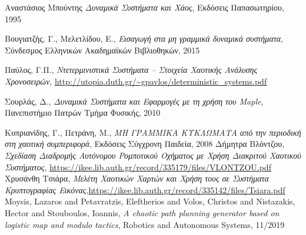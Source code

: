 \begin{thebibliography}{9}
	Αναστάσιος Μπούντης \emph{Δυναμικά Συστήματα και Χάος}, Εκδόσεις Παπασωτηρίου, 1995
	
	Βουγιατζής, Γ., Μελετλίδου, Ε.,\emph{ Εισαγωγή στα μη γραμμικά δυναμικά συστήματα}, Σύνδεσμος
	Ελληνικών Ακαδημαϊκών Βιβλιοθηκών, 2015
	
	Παύλος, Γ.Π., \emph{Ντετερμινιστικά Συστήματα – Στοιχεία Χαοτικής Ανάλυσης Χρονοσειρών}, 
	\url{http://utopia.duth.gr/~gpavlos/deterministic_systems.pdf}
	
	Σουρλάς, Δ., \emph{Δυναμικά Συστήματα και Εφαρμογές με τη χρήση του Maple}, Πανεπιστήμιο Πατρών Τμήμα Φυσικής, 2010
	
	Κυπριανίδης, Γ., Πετράνη, Μ., \emph{ΜΗ ΓΡΑΜΜΙΚΑ ΚΥΚΛΩΜΑΤΑ από την περιοδική στη χαοτική συμπεριφορά}, Εκδόσεις Σύγχρονη Παιδεία, 2008
	Δήμητρα Βλόντζου, \emph{Σχεδίαση Διαδρομής Αυτόνομου Ρομποτικού Οχήματος με Χρήση Διακριτού Χαοτικού Συστήματος}, \url{https://ikee.lib.auth.gr/record/335179/files/VLONTZOU.pdf}
	Χρυσάνθη Τσιάρα, \emph{Μελέτη Χαοτικών Χαρτών και Χρήση τους σε
		Συστήματα Κρυπτογραφίας Εικόνας},\url{https://ikee.lib.auth.gr/record/335142/files/Tsiara.pdf}
	Moysis, Lazaros and Petavratzis, Eleftherios and Volos, Christos and Nistazakis, Hector and Stouboulos, Ioannis, \emph{A chaotic path planning generator based on logistic map and modulo tactics}, Robotics and Autonomous Systems, 11/2019
	
	
\end{thebibliography}


\clearpage